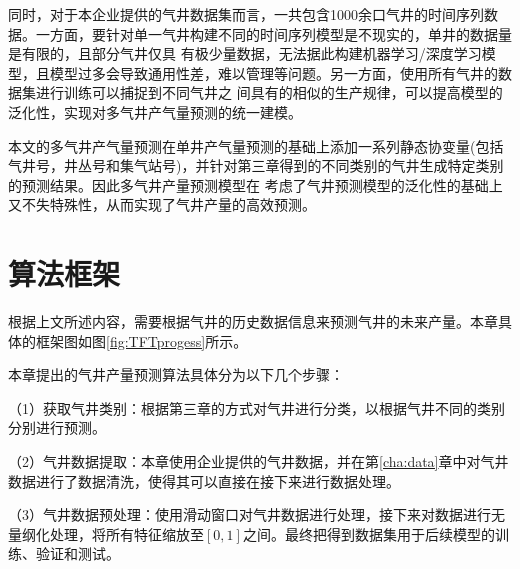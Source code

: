 同时，对于本企业提供的气井数据集而言，一共包含1000余口气井的时间序列数据。一方面，要针对单一气井构建不同的时间序列模型是不现实的，单井的数据量是有限的，且部分气井仅具
有极少量数据，无法据此构建机器学习/深度学习模型，且模型过多会导致通用性差，难以管理等问题。另一方面，使用所有气井的数据集进行训练可以捕捉到不同气井之
间具有的相似的生产规律，可以提高模型的泛化性，实现对多气井产气量预测的统一建模。

本文的多气井产气量预测在单井产气量预测的基础上添加一系列静态协变量(包括气井号，井丛号和集气站号)，并针对第三章得到的不同类别的气井生成特定类别的预测结果。因此多气井产量预测模型在
考虑了气井预测模型的泛化性的基础上又不失特殊性，从而实现了气井产量的高效预测。
\section{算法框架}
根据上文所述内容，需要根据气井的历史数据信息来预测气井的未来产量。本章具体的框架图如图\ref{fig:TFTprogess}所示。

本章提出的气井产量预测算法具体分为以下几个步骤：

（1）获取气井类别：根据第三章的方式对气井进行分类，以根据气井不同的类别分别进行预测。

（2）气井数据提取：本章使用企业提供的气井数据，并在第\ref{cha:data}章中对气井数据进行了数据清洗，使得其可以直接在接下来进行数据处理。

（3）气井数据预处理：使用滑动窗口对气井数据进行处理，接下来对数据进行无量纲化处理，将所有特征缩放至$[0,1]$之间。最终把得到数据集用于后续模型的训练、验证和测试。

